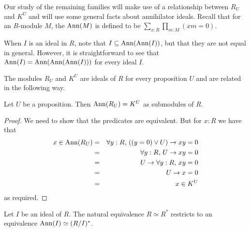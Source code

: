 Our study of the remaining families will make use of a relationship between $R_U$ and $K^U$
and will use some general facts about annihilator ideals.
Recall that for an $R$-module $M$, the 
$\operatorname{Ann}(M)$ is defined to be $\sum_{x : R} \prod_{m : M} (xm = 0)$.

\begin{remark}\label{rmk:triple-Ann}
When $I$ is an ideal in $R$, note that $I \subseteq \operatorname{Ann}(\operatorname{Ann}(I))$,
but that they are not equal in general.
However, it is straightforward to see that $\operatorname{Ann}(I) = \operatorname{Ann}(\operatorname{Ann}(\operatorname{Ann}(I)))$
for every ideal $I$.
\end{remark}

The modules $R_U$ and $K^U$ are ideals of $R$ for every proposition $U$
and are related in the following way.

\begin{lemma}\label{lem:ann-R_U-K^U}
  Let $U$ be a proposition.
  Then $\operatorname{Ann}(R_U) = K^U$ as submodules of $R$.
\end{lemma}

\begin{proof}
  We need to show that the predicates are equivalent. But for $x:R$ we have that
  \begin{eqnarray*}
    x\in \operatorname{Ann}(R_U) &=& \forall y:R,\, ((y=0) \lor U) \to xy=0 \\
    & = & \forall y:R,\, U\to xy=0 \\
    & = & U\to \forall y:R,\, xy=0 \\
    & = & U\to x=0 \\
    & = & x\in K^U
  \end{eqnarray*}
  as required.
\end{proof}

\begin{lemma}\label{lem:ann-dual-quotient}
  Let $I$ be an ideal of $R$.
  The natural equivalence $R \simeq R^*$ restricts to an equivalence
  $\operatorname{Ann}(I) \simeq (R/I)^*$.
\end{lemma}

